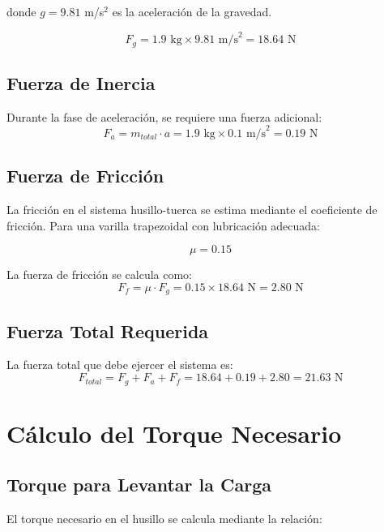 donde $g = 9.81$ m/s$^2$ es la aceleración de la gravedad.

\begin{equation}
F_g = 1.9 \text{ kg} \times 9.81 \text{ m/s}^2 = 18.64 \text{ N}
\end{equation}

\subsection{Fuerza de Inercia}
Durante la fase de aceleración, se requiere una fuerza adicional:
\begin{equation}
F_a = m_{total} \cdot a = 1.9 \text{ kg} \times 0.1 \text{ m/s}^2 = 0.19 \text{ N}
\end{equation}

\subsection{Fuerza de Fricción}
La fricción en el sistema husillo-tuerca se estima mediante el coeficiente de fricción. Para una varilla trapezoidal con lubricación adecuada:

\begin{equation}
\mu = 0.15
\end{equation}

La fuerza de fricción se calcula como:
\begin{equation}
F_f = \mu \cdot F_g = 0.15 \times 18.64 \text{ N} = 2.80 \text{ N}
\end{equation}

\subsection{Fuerza Total Requerida}
La fuerza total que debe ejercer el sistema es:
\begin{equation}
F_{total} = F_g + F_a + F_f = 18.64 + 0.19 + 2.80 = 21.63 \text{ N}
\end{equation}

\section{Cálculo del Torque Necesario}

\subsection{Torque para Levantar la Carga}
El torque necesario en el husillo se calcula mediante la relación:

